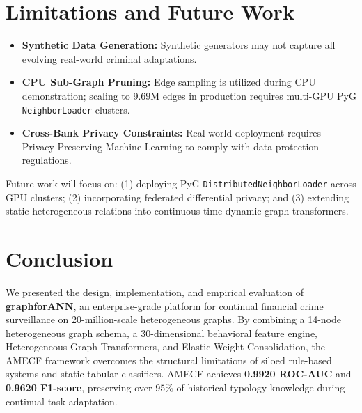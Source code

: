\documentclass[conference]{IEEEtran}
\begin{document}
\section{Limitations and Future Work}
\begin{itemize}
    \item \textbf{Synthetic Data Generation:} Synthetic generators may not capture all evolving real-world criminal adaptations.
    \item \textbf{CPU Sub-Graph Pruning:} Edge sampling is utilized during CPU demonstration; scaling to 9.69M edges in production requires multi-GPU PyG \texttt{NeighborLoader} clusters.
    \item \textbf{Cross-Bank Privacy Constraints:} Real-world deployment requires Privacy-Preserving Machine Learning to comply with data protection regulations.
\end{itemize}

Future work will focus on: (1) deploying PyG \texttt{DistributedNeighborLoader} across GPU clusters; (2) incorporating federated differential privacy; and (3) extending static heterogeneous relations into continuous-time dynamic graph transformers.

\section{Conclusion}
We presented the design, implementation, and empirical evaluation of \textbf{graphforANN}, an enterprise-grade platform for continual financial crime surveillance on 20-million-scale heterogeneous graphs. By combining a 14-node heterogeneous graph schema, a 30-dimensional behavioral feature engine, Heterogeneous Graph Transformers, and Elastic Weight Consolidation, the AMECF framework overcomes the structural limitations of siloed rule-based systems and static tabular classifiers. AMECF achieves \textbf{0.9920 ROC-AUC} and \textbf{0.9620 F1-score}, preserving over $95\%$ of historical typology knowledge during continual task adaptation.



\end{document}
